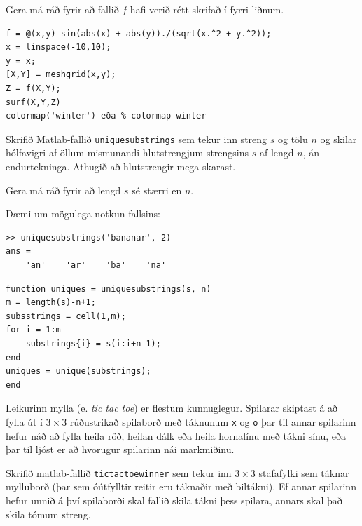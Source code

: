 \documentclass[addpoints]{exam}
\begin{document}
\begin{questions}
\begin{parts}
Gera má ráð fyrir að fallið $f$ hafi verið rétt skrifað í fyrri liðnum.

\end{parts}

\begin{solution}

\begin{verbatim}
f = @(x,y) sin(abs(x) + abs(y))./(sqrt(x.^2 + y.^2));
x = linspace(-10,10); 
y = x; 
[X,Y] = meshgrid(x,y); 
Z = f(X,Y);
surf(X,Y,Z)
colormap('winter') eða % colormap winter
\end{verbatim}
\end{solution}

\newpage

\question[10] Skrifið Matlab-fallið \texttt{uniquesubstrings} sem tekur inn streng $s$ og tölu $n$ og skilar hólfavigri af öllum mismunandi hlutstrengjum strengsins $s$ af lengd $n$, án endurtekninga. Athugið að hlutstrengir mega skarast.

Gera má ráð fyrir að lengd $s$ sé stærri en $n$.

Dæmi um mögulega notkun fallsins:
\begin{verbatim}
>> uniquesubstrings('bananar', 2)
ans = 
    'an'    'ar'    'ba'    'na'
\end{verbatim}

\begin{solution}
    
\begin{verbatim}
function uniques = uniquesubstrings(s, n)
m = length(s)-n+1;
subsstrings = cell(1,m);
for i = 1:m
    substrings{i} = s(i:i+n-1);
end
uniques = unique(substrings);
end
\end{verbatim}
   
\end{solution}

\newpage

\question[10] Leikurinn mylla (e. \emph{tic tac toe}) er flestum kunnuglegur. Spilarar skiptast á að fylla út í $3 \times 3$ rúðustrikað spilaborð með táknunum \texttt{x} og \texttt{o} þar til annar spilarinn hefur náð að fylla heila röð, heilan dálk eða heila hornalínu með tákni sínu, eða þar til ljóst er að hvorugur spilarinn nái markmiðinu.

Skrifið matlab-fallið \texttt{tictactoewinner} sem tekur inn $3 \times 3$ stafafylki sem táknar mylluborð (þar sem óútfylltir reitir eru táknaðir með biltákni). Ef annar spilarinn hefur unnið á því spilaborði skal fallið skila tákni þess spilara, annars skal það skila tómum streng.


\end{questions}
\end{document}

